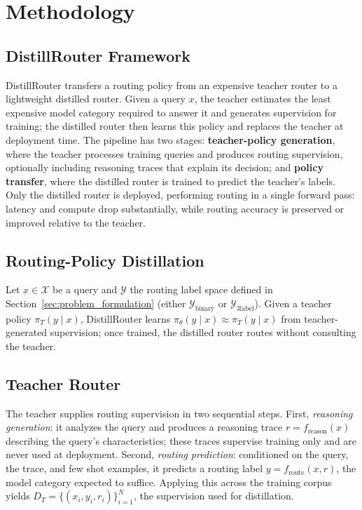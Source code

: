 \documentclass{article}
\begin{document}
\section{Methodology}
\label{sec:methodology}

\subsection{DistillRouter Framework}
\label{sec:distillrouter_framework}

DistillRouter transfers a routing policy from an expensive teacher router to a lightweight distilled router. Given a query $x$, the teacher estimates the least expensive model category required to answer it and generates supervision for training; the distilled router then learns this policy and replaces the teacher at deployment time. The pipeline has two stages: \textbf{teacher-policy generation}, where the teacher processes training queries and produces routing supervision, optionally including reasoning traces that explain its decision; and \textbf{policy transfer}, where the distilled router is trained to predict the teacher's labels. Only the distilled router is deployed, performing routing in a single forward pass: latency and compute drop substantially, while routing accuracy is preserved or improved relative to the teacher.

\subsection{Routing-Policy Distillation}
\label{sec:distillation}

Let $x \in \mathcal{X}$ be a query and $\mathcal{Y}$ the routing label space defined in Section~\ref{sec:problem_formulation} (either $\mathcal{Y}_{\text{binary}}$ or $\mathcal{Y}_{\text{3label}}$). Given a teacher policy $\pi_T(y \mid x)$, DistillRouter learns $\pi_\theta(y \mid x) \approx \pi_T(y \mid x)$ from teacher-generated supervision; once trained, the distilled router routes without consulting the teacher.

\subsection{Teacher Router}
\label{sec:teacher-routing}

The teacher supplies routing supervision in two sequential steps. First, \emph{reasoning generation}: it analyzes the query and produces a reasoning trace $r = f_{\text{reason}}(x)$ describing the query's characteristics; these traces supervise training only and are never used at deployment. Second, \emph{routing prediction}: conditioned on the query, the trace, and few shot examples, it predicts a routing label $y = f_{\text{route}}(x, r)$, the model category expected to suffice. Applying this across the training corpus yields $D_T = \{(x_i, y_i, r_i)\}_{i=1}^{N}$, the supervision used for distillation.
\end{document}

